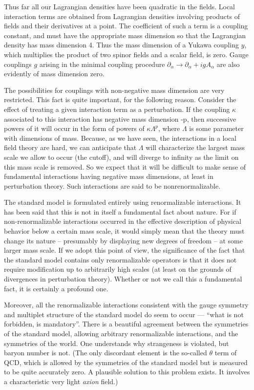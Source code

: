 \documentclass[12pt]{article}
\begin{document}
Thus far all our Lagrangian
densities have been quadratic in the fields. Local interaction terms
are obtained from Lagrangian densities involving products of fields
and their derivatives at a point.   The coefficient of such a term is
a coupling constant, and must have the appropriate mass dimension so
that  the Lagrangian density has mass dimension 4.  Thus the mass
dimension of  a Yukawa coupling $y$, which multiplies the product of
two spinor fields and a scalar field, is zero.   Gauge couplings $g$
arising in the minimal coupling procedure $\partial_\alpha \rightarrow
\partial_\alpha + i g A_\alpha$ are also evidently of mass dimension
zero.    

The possibilities for couplings with non-negative mass
dimension are very restricted. This fact is quite important, for
the following reason.  Consider the effect of treating a given
interaction term as a perturbation.  If the coupling $\kappa$
associated to this interaction has negative mass dimension -p, then
successive powers of it will occur in the form of powers of 
$\kappa \Lambda^p$,
where $\Lambda$ is some parameter with dimensions of mass.  Because,
as we have seen, the interactions in a local field theory are hard, we
can anticipate that $\Lambda$ will characterize the largest mass scale
we allow to occur (the cutoff),   and will diverge to infinity as the
limit on this mass scale is removed.  So we expect that it will be
difficult to make sense of fundamental interactions having negative
mass dimensions, at least in perturbation theory.  Such interactions
are said to be nonrenormalizable.   

The standard model is formulated
entirely using renormalizable interactions.    It has been said that
this is not in itself a fundamental fact about nature.  For if
non-renormalizable interactions occurred in the effective description
of physical behavior below a certain mass scale, it would simply mean
that the theory must change its nature -- presumably by displaying new
degrees of freedom --  at some larger mass scale.   If we adopt this
point of view, the significance of the fact that the standard model
contains only renormalizable operators is that it does not require
modification up to arbitrarily high scales (at least on the grounds of
divergences in perturbation theory).    
Whether or not we call this a fundamental fact, it is certainly a
profound one.  

Moreover, all the renormalizable interactions
consistent with the gauge symmetry and multiplet structure of the
standard model do seem to occur --- ``what is not forbidden, is
mandatory''.   There is a beautiful agreement between the symmetries
of the standard model, allowing arbitrary renormalizable interactions,
and the symmetries of the world.  One understands why strangeness is
violated, but baryon number is not.  (The only discordant element  is
the so-called $\theta$ term of QCD, which is allowed by the symmetries
of the standard model but is measured to be quite accurately zero.   
A plausible solution to this problem exists.  It involves a
characteristic very light {\it axion\/} field.) 
\end{document}
